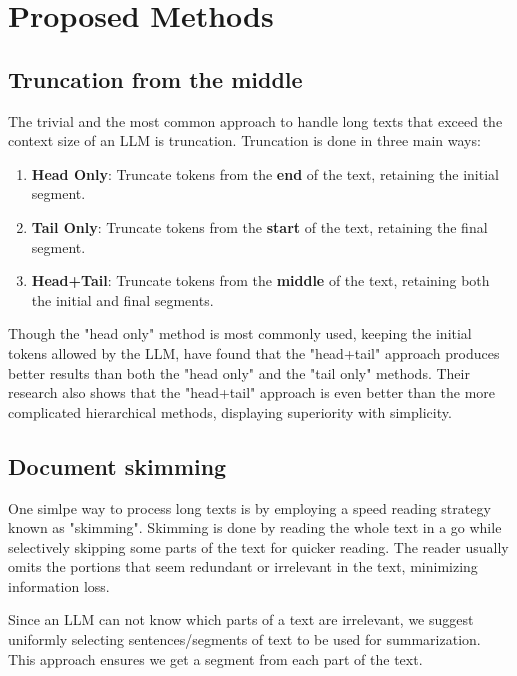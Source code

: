 \section{Proposed Methods}
\label{sec:methodology}


\subsection{Truncation from the middle}
\label{sub:truncation}

The trivial and the most common approach to handle long texts that exceed the context
size of an LLM is truncation.
Truncation is done in three main ways:

\begin{enumerate}
	\item \textbf{Head Only}: Truncate tokens from the \textbf{end} of the text,
	retaining the initial segment.
	\item \textbf{Tail Only}: Truncate tokens from the \textbf{start} of the text,
	retaining the final segment.
	\item \textbf{Head+Tail}: Truncate tokens from the \textbf{middle} of the text,
	retaining both the initial and final segments.
\end{enumerate}

Though the "head only" method is most commonly used, keeping the initial tokens
allowed by the LLM, \citet{sun2019fine} have found that the "head+tail" approach
produces better results than both the "head only" and the "tail only" methods.
Their research also shows that the "head+tail" approach is even better than the more
complicated hierarchical methods, displaying superiority with simplicity.


\subsection{Document skimming}
\label{sub:skimming}

One simlpe way to process long texts is by employing a speed reading strategy known as
"skimming".
Skimming is done by reading the whole text in a go while selectively skipping some
parts of the text for quicker reading.
The reader usually omits the portions that seem redundant or irrelevant in the text,
minimizing information loss.

Since an LLM can not know which parts of a text are irrelevant, we suggest uniformly
selecting sentences/segments of text to be used for summarization.
This approach ensures we get a segment from each part of the text.

